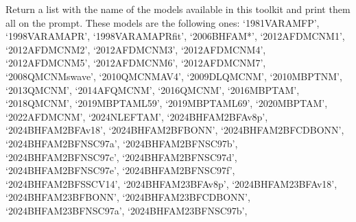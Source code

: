 \documentclass[letterpaper,10pt,english]{sphinxmanual}
\begin{document}
\begin{fulllineitems}
\label{\detokenize{source/api/setup_eos_micro:nucleardatapy.eos.setup_micro.micro_models}}
\pysigstartsignatures
{}
\pysigstopsignatures
\sphinxAtStartPar
Return a list with the name of the models available in this toolkit and     print them all on the prompt. These models are the following ones:     ‘1981\sphinxhyphen{}VAR\sphinxhyphen{}AM\sphinxhyphen{}FP’, ‘1998\sphinxhyphen{}VAR\sphinxhyphen{}AM\sphinxhyphen{}APR’, ‘1998\sphinxhyphen{}VAR\sphinxhyphen{}AM\sphinxhyphen{}APRfit’, ‘2006\sphinxhyphen{}BHF\sphinxhyphen{}AM*’,     ‘2012\sphinxhyphen{}AFDMC\sphinxhyphen{}NM\sphinxhyphen{}1’, ‘2012\sphinxhyphen{}AFDMC\sphinxhyphen{}NM\sphinxhyphen{}2’, ‘2012\sphinxhyphen{}AFDMC\sphinxhyphen{}NM\sphinxhyphen{}3’, ‘2012\sphinxhyphen{}AFDMC\sphinxhyphen{}NM\sphinxhyphen{}4’,     ‘2012\sphinxhyphen{}AFDMC\sphinxhyphen{}NM\sphinxhyphen{}5’, ‘2012\sphinxhyphen{}AFDMC\sphinxhyphen{}NM\sphinxhyphen{}6’, ‘2012\sphinxhyphen{}AFDMC\sphinxhyphen{}NM\sphinxhyphen{}7’,     ‘2008\sphinxhyphen{}QMC\sphinxhyphen{}NM\sphinxhyphen{}swave’, ‘2010\sphinxhyphen{}QMC\sphinxhyphen{}NM\sphinxhyphen{}AV4’, ‘2009\sphinxhyphen{}DLQMC\sphinxhyphen{}NM’, ‘2010\sphinxhyphen{}MBPT\sphinxhyphen{}NM’,     ‘2013\sphinxhyphen{}QMC\sphinxhyphen{}NM’, ‘2014\sphinxhyphen{}AFQMC\sphinxhyphen{}NM’, ‘2016\sphinxhyphen{}QMC\sphinxhyphen{}NM’, ‘2016\sphinxhyphen{}MBPT\sphinxhyphen{}AM’,     ‘2018\sphinxhyphen{}QMC\sphinxhyphen{}NM’, ‘2019\sphinxhyphen{}MBPT\sphinxhyphen{}AM\sphinxhyphen{}L59’, ‘2019\sphinxhyphen{}MBPT\sphinxhyphen{}AM\sphinxhyphen{}L69’,     ‘2020\sphinxhyphen{}MBPT\sphinxhyphen{}AM’, ‘2022\sphinxhyphen{}AFDMC\sphinxhyphen{}NM’, ‘2024\sphinxhyphen{}NLEFT\sphinxhyphen{}AM’,     ‘2024\sphinxhyphen{}BHF\sphinxhyphen{}AM\sphinxhyphen{}2BF\sphinxhyphen{}Av8p’, ‘2024\sphinxhyphen{}BHF\sphinxhyphen{}AM\sphinxhyphen{}2BF\sphinxhyphen{}Av18’, ‘2024\sphinxhyphen{}BHF\sphinxhyphen{}AM\sphinxhyphen{}2BF\sphinxhyphen{}BONN’, ‘2024\sphinxhyphen{}BHF\sphinxhyphen{}AM\sphinxhyphen{}2BF\sphinxhyphen{}CDBONN’,     ‘2024\sphinxhyphen{}BHF\sphinxhyphen{}AM\sphinxhyphen{}2BF\sphinxhyphen{}NSC97a’, ‘2024\sphinxhyphen{}BHF\sphinxhyphen{}AM\sphinxhyphen{}2BF\sphinxhyphen{}NSC97b’, ‘2024\sphinxhyphen{}BHF\sphinxhyphen{}AM\sphinxhyphen{}2BF\sphinxhyphen{}NSC97c’, ‘2024\sphinxhyphen{}BHF\sphinxhyphen{}AM\sphinxhyphen{}2BF\sphinxhyphen{}NSC97d’,     ‘2024\sphinxhyphen{}BHF\sphinxhyphen{}AM\sphinxhyphen{}2BF\sphinxhyphen{}NSC97e’, ‘2024\sphinxhyphen{}BHF\sphinxhyphen{}AM\sphinxhyphen{}2BF\sphinxhyphen{}NSC97f’, ‘2024\sphinxhyphen{}BHF\sphinxhyphen{}AM\sphinxhyphen{}2BF\sphinxhyphen{}SSCV14’,    ‘2024\sphinxhyphen{}BHF\sphinxhyphen{}AM\sphinxhyphen{}23BF\sphinxhyphen{}Av8p’, ‘2024\sphinxhyphen{}BHF\sphinxhyphen{}AM\sphinxhyphen{}23BF\sphinxhyphen{}Av18’, ‘2024\sphinxhyphen{}BHF\sphinxhyphen{}AM\sphinxhyphen{}23BF\sphinxhyphen{}BONN’, ‘2024\sphinxhyphen{}BHF\sphinxhyphen{}AM\sphinxhyphen{}23BF\sphinxhyphen{}CDBONN’,     ‘2024\sphinxhyphen{}BHF\sphinxhyphen{}AM\sphinxhyphen{}23BF\sphinxhyphen{}NSC97a’, ‘2024\sphinxhyphen{}BHF\sphinxhyphen{}AM\sphinxhyphen{}23BF\sphinxhyphen{}NSC97b’, 
\end{fulllineitems}
\end{document}
